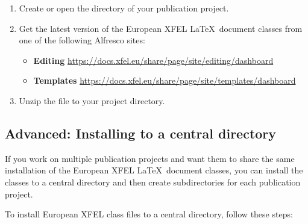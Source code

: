 \documentclass[]{xfel.eu-report}
\begin{document}
\begin{enumerate}
  \item Create or open the directory of your publication project.
  \linebreak
  \item Get the latest version of the European XFEL \LaTeX\ document classes from one of the following Alfresco sites:
  \linebreak
	\begin{itemize}
		\item {\bf Editing} 
		\linebreak
		\url{https://docs.xfel.eu/share/page/site/editing/dashboard}
		\linebreak
		\item {\bf Templates} 
		\linebreak
		\url{https://docs.xfel.eu/share/page/site/templates/dashboard}
		\linebreak
	\end{itemize} 
  \item Unzip the file to your project directory.
\end{enumerate}

\newpage
\subsection{Advanced: Installing to a central directory}
\label{installing-document-classes-2}

If you work on multiple publication projects and want them 
to share the same installation of the European XFEL \LaTeX\ document classes, you can 
install the classes to a central directory and then create subdirectories for each
publication project.

To install European XFEL class files to a central directory, follow these steps: 
\end{document}
